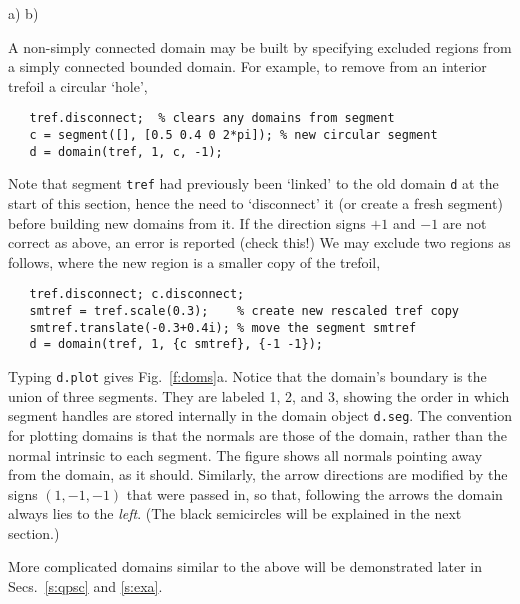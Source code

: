 \bfi %
a)
b)
\efi

A non-simply connected domain may be built by specifying excluded
regions from a simply connected bounded domain. For example,
to remove from an interior trefoil a circular `hole',
\begin{verbatim}
   tref.disconnect;  % clears any domains from segment
   c = segment([], [0.5 0.4 0 2*pi]); % new circular segment
   d = domain(tref, 1, c, -1);
\end{verbatim}
Note that segment {\tt tref} had previously
been `linked' to the old domain {\tt d}
at the start of this section, hence the need to `disconnect' it
(or create a fresh segment) before
building new domains from it. 
If the direction signs $+1$ and $-1$ are not correct as above, an
error is reported (check this!)
We may exclude two regions as follows, where the new region is a smaller copy
of the trefoil,
\begin{verbatim}
   tref.disconnect; c.disconnect;
   smtref = tref.scale(0.3);    % create new rescaled tref copy
   smtref.translate(-0.3+0.4i); % move the segment smtref
   d = domain(tref, 1, {c smtref}, {-1 -1});
\end{verbatim}
Typing {\tt d.plot} gives Fig.~\ref{f:doms}a. Notice that
the domain's boundary is the union of three segments. They are labeled
1, 2, and 3, showing the order in which segment handles
are stored internally in the domain object {\tt d.seg}.
The convention for plotting domains is that the normals
are those of the domain, rather than the normal intrinsic to each segment.
The figure shows all normals pointing away from the domain, as it should.
Similarly, the arrow directions are modified by the signs $(1,-1,-1)$ that
were passed in, so that, following the arrows the domain always lies to
the {\em left}. (The black semicircles will be explained in the next section.)

More complicated domains similar to the above will be demonstrated later in
Secs.~\ref{s:qpsc} and \ref{s:exa}.

\vspace{10ex}



